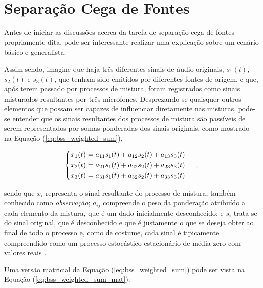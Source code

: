 \chapter{Separação Cega de Fontes}
\label{cha:bss}

Antes de iniciar as discussões acerca da tarefa de separação cega de fontes propriamente dita, pode ser interessante realizar uma explicação sobre um cenário básico e generalista.

Assim sendo, imagine que haja três diferentes sinais de áudio originais, $s_{1}(t)$, $s_{2}(t)$ e $s_{3}(t)$, que tenham sido emitidos por diferentes fontes de origem, e que, após terem passado por processos de mistura, foram registrados como sinais misturados resultantes por três microfones. Desprezando-se quaisquer outros elementos que possam ser capazes de influenciar diretamente nas misturas, pode-se entender que os sinais resultantes dos processos de mistura são passíveis de serem representados por somas ponderadas dos sinais originais, como mostrado na Equação (\ref{eq:bss_weighted_sum}),

\begin{equation}
\begin{cases}
\begin{aligned}
    x_{1}(t) = a_{11} s_{1}(t) +  a_{12} s_{2}(t) +  a_{13} s_{3}(t) \\
    x_{2}(t) = a_{21} s_{1}(t) +  a_{22} s_{2}(t) +  a_{23} s_{3}(t) \\
    x_{3}(t) = a_{31} s_{1}(t) +  a_{32} s_{2}(t) +  a_{33} s_{3}(t)
    \label{eq:bss_weighted_sum}
\end{aligned}
\end{cases}
\hspace{0.1cm},
\vspace{0.2cm}
\end{equation}

\noindent sendo que $x_{i}$ representa o sinal resultante do processo de mistura, também conhecido como \textit{observação}; $a_{ij}$ compreende o peso da ponderação atribuído a cada elemento da mistura, que é um dado inicialmente desconhecido; e $s_{i}$ trata-se do sinal original, que é desconhecido e que é justamente o que se deseja obter ao final de todo o processo e, como de costume, cada sinal é tipicamente compreendido como um processo estocástico estacionário de média zero com valores reais \citep{papoulis1984probability}.

Uma versão matricial da Equação (\ref{eq:bss_weighted_sum}) pode ser vista na Equação (\ref{eq:bss_weighted_sum_mat}):


